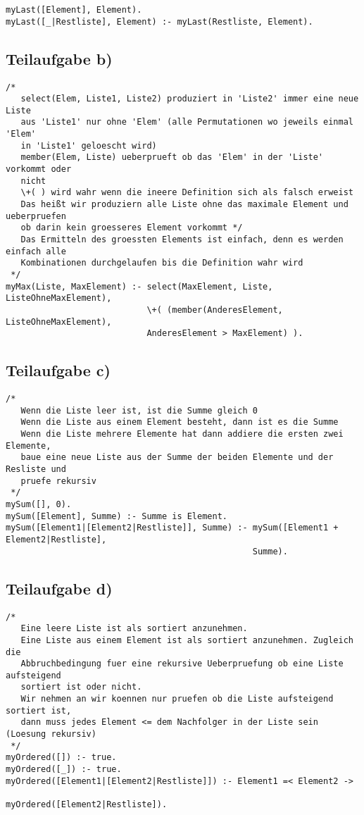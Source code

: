 \documentclass{article}
\begin{document}
\begin{verbatim}
myLast([Element], Element). 
myLast([_|Restliste], Element) :- myLast(Restliste, Element).
\end{verbatim}

\subsection{Teilaufgabe b)}

\begin{verbatim}
/* 
   select(Elem, Liste1, Liste2) produziert in 'Liste2' immer eine neue Liste
   aus 'Liste1' nur ohne 'Elem' (alle Permutationen wo jeweils einmal 'Elem'
   in 'Liste1' geloescht wird)
   member(Elem, Liste) ueberprueft ob das 'Elem' in der 'Liste' vorkommt oder
   nicht
   \+( ) wird wahr wenn die ineere Definition sich als falsch erweist
   Das heißt wir produziern alle Liste ohne das maximale Element und ueberpruefen
   ob darin kein groesseres Element vorkommt */
   Das Ermitteln des groessten Elements ist einfach, denn es werden einfach alle
   Kombinationen durchgelaufen bis die Definition wahr wird
 */
myMax(Liste, MaxElement) :- select(MaxElement, Liste, ListeOhneMaxElement),
                            \+( (member(AnderesElement, ListeOhneMaxElement),
                            AnderesElement > MaxElement) ).
\end{verbatim}

\subsection{Teilaufgabe c)}

\begin{verbatim}
/* 
   Wenn die Liste leer ist, ist die Summe gleich 0
   Wenn die Liste aus einem Element besteht, dann ist es die Summe
   Wenn die Liste mehrere Elemente hat dann addiere die ersten zwei Elemente,
   baue eine neue Liste aus der Summe der beiden Elemente und der Resliste und
   pruefe rekursiv
 */
mySum([], 0).
mySum([Element], Summe) :- Summe is Element.
mySum([Element1|[Element2|Restliste]], Summe) :- mySum([Element1 + Element2|Restliste],
                                                 Summe).
\end{verbatim}

\newpage

\subsection{Teilaufgabe d)}

\begin{verbatim}
/* 
   Eine leere Liste ist als sortiert anzunehmen.
   Eine Liste aus einem Element ist als sortiert anzunehmen. Zugleich die
   Abbruchbedingung fuer eine rekursive Ueberpruefung ob eine Liste aufsteigend
   sortiert ist oder nicht.
   Wir nehmen an wir koennen nur pruefen ob die Liste aufsteigend sortiert ist,
   dann muss jedes Element <= dem Nachfolger in der Liste sein (Loesung rekursiv)
 */
myOrdered([]) :- true.
myOrdered([_]) :- true.
myOrdered([Element1|[Element2|Restliste]]) :- Element1 =< Element2 ->
                                              myOrdered([Element2|Restliste]).
\end{verbatim}
\end{document}
